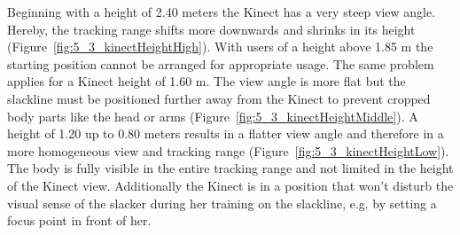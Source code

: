 Beginning with a height of 2.40 meters the Kinect has a very steep view angle.
Hereby, the tracking range shifts more downwards and shrinks in its height (Figure~\ref{fig:5_3_kinectHeightHigh}).
With users of a height above 1.85 m the starting position cannot be arranged for appropriate usage.
The same problem applies for a Kinect height of 1.60 m. The view angle is more flat but the slackline must be positioned further away from the Kinect to prevent cropped body parts like the head or arms (Figure~\ref{fig:5_3_kinectHeightMiddle}).
A height of 1.20 up to 0.80 meters results in a flatter view angle and therefore in a more homogeneous view and tracking range (Figure~\ref{fig:5_3_kinectHeightLow}).
The body is fully visible in the entire tracking range and not limited in the height of the Kinect view.
Additionally the Kinect is in a position that won't disturb the visual sense of the slacker during her training on the slackline, e.g. by setting a focus point in front of her. 

